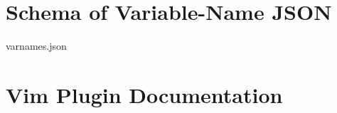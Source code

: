 \begin{appendices}
	\chapter{Schema of Variable-Name JSON}
	\label{appendix:schema}
	
		{varnames.json}
	\chapter{Vim Plugin Documentation}
	\label{appendix:vimplugindoc}
	

\end{appendices}

